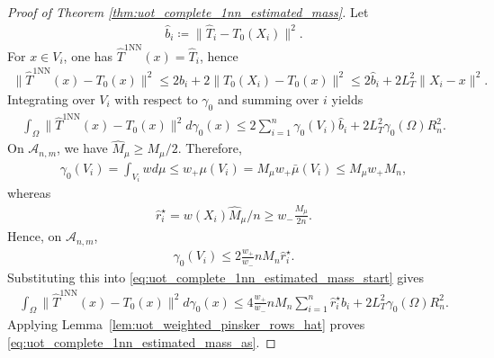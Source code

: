 \documentclass[10pt,a4paper]{amsart}
\renewcommand{\hat}{\widehat}
\begin{document}
\begin{proof}[Proof of Theorem \ref{thm:uot_complete_1nn_estimated_mass}]
Let
\begin{align}
    \hat b_i \coloneqq \|\hat T_i-T_0(X_i)\|^2.
\end{align}
For $x\in V_i$, one has $\hat T^{\mathrm{1NN}}(x)=\hat T_i$, hence
\begin{align}
    \|\hat T^{\mathrm{1NN}}(x)-T_0(x)\|^2
    \le
    2\hat b_i + 2\|T_0(X_i)-T_0(x)\|^2
    \le
    2\hat b_i + 2L_T^2\|X_i-x\|^2.
\end{align}
Integrating over $V_i$ with respect to $\gamma_0$ and summing over $i$ yields
\begin{align}
\label{eq:uot_complete_1nn_estimated_mass_start}
    \int_\Omega \|\hat T^{\mathrm{1NN}}(x)-T_0(x)\|^2  d\gamma_0(x)
    \le
    2\sum_{i=1}^n \gamma_0(V_i)\hat b_i
    + 2L_T^2\gamma_0(\Omega)R_n^2.
\end{align}
On $\mathcal{A}_{n,m}$, we have $\hat M_\mu\ge M_\mu/2$.
Therefore,
\begin{align}
    \gamma_0(V_i)
    = \int_{V_i} w  d\mu
    \le
    w_+ \mu(V_i)
    = M_\mu w_+\bar\mu(V_i)
    \le
    M_\mu w_+ M_n,
\end{align}
whereas
\begin{align}
    \hat r_i^\star = w(X_i){\hat M_\mu/n}
    \ge
    w_-\frac{M_\mu}{2n}.
\end{align}
Hence, on $\mathcal{A}_{n,m}$,
\begin{align}
    \gamma_0(V_i)
    \le
    2\frac{w_+}{w_-}  nM_n \hat r_i^\star.
\end{align}
Substituting this into \eqref{eq:uot_complete_1nn_estimated_mass_start} gives
\begin{align}
    \int_\Omega \|\hat T^{\mathrm{1NN}}(x)-T_0(x)\|^2  d\gamma_0(x)
    \le
    4\frac{w_+}{w_-}  nM_n \sum_{i=1}^n \hat r_i^\star\hat b_i
    + 2L_T^2\gamma_0(\Omega)R_n^2.
\end{align}
Applying Lemma~\ref{lem:uot_weighted_pinsker_rows_hat} proves
\eqref{eq:uot_complete_1nn_estimated_mass_as}.


\end{proof}
\end{document}
